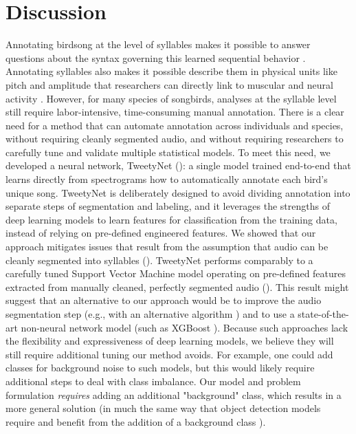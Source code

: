\documentclass[9pt,lineno]{elife}
\begin{document}
\section{Discussion}
\label{Discussion}
Annotating birdsong at the level of syllables 
makes it possible to answer questions about the syntax governing this learned sequential behavior
\citep{berwick2011songs}. 
Annotating syllables also makes it possible describe them in  
physical units like pitch and amplitude that researchers can directly link  
to muscular and neural activity \citep{soberCentralContributionsAcoustic2008, wohlgemuth_linked_2010}.
However, for many species of songbirds, analyses at the syllable level 
still require labor-intensive, time-consuming manual annotation. 
There is a clear need for a method that can automate annotation across individuals and species, 
without requiring cleanly segmented audio, 
and without requiring researchers to carefully tune and validate multiple statistical models. 
To meet this need, we developed a neural network, TweetyNet (): 
a single model trained end-to-end that learns directly from spectrograms 
how to automatically annotate each bird's unique song.
TweetyNet is deliberately designed to avoid dividing annotation into separate steps 
of segmentation and labeling, 
and it leverages the strengths of deep learning models 
to learn features for classification from the training data,  
instead of relying on pre-defined engineered features. 
We showed that our approach mitigates issues that result from 
the assumption that audio can be cleanly segmented into syllables (). 
TweetyNet performs comparably to a carefully tuned Support Vector Machine model 
operating on pre-defined features extracted from manually cleaned, perfectly segmented audio (). 
This result might suggest that an alternative to our approach 
would be to improve the audio segmentation step 
(e.g., with an alternative algorithm \citep{tchernichovski_procedure_2000})
and to use a state-of-the-art non-neural network model 
(such as XGBoost \citep{Chen:2016:XST:2939672.2939785}). 
Because such approaches lack the flexibility and expressiveness of deep learning models,  
we believe they will still require additional tuning our method avoids. 
For example, one could add classes for background noise to such models, 
but this would likely require additional steps to deal with class imbalance. 
Our model and problem formulation \textit{requires} adding an additional "background" class, 
which results in a more general solution  
(in much the same way that object detection models require and benefit 
from the addition of a background class \citep{scheirerOpenSetRecognition2013}).
\end{document}
